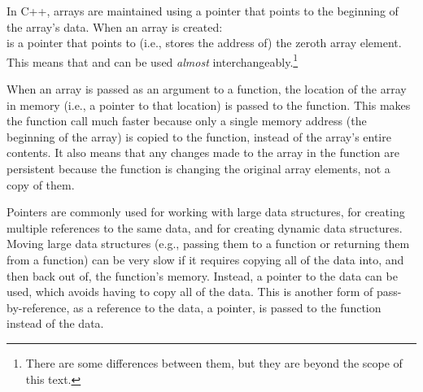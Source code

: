 
In C++, arrays are maintained using a pointer that points to the beginning of the array's data.  When an array is created:\\
 is a pointer that points to (i.e., stores the address of) the zeroth array element.  This means that  and  can be used \emph{almost} interchangeably.\footnote{There are some differences between them, but they are beyond the scope of this text.}  

When an array is passed as an argument to a function, the location of the array in memory (i.e., a pointer to that location) is passed to the function.  This makes the function call much faster because only a single memory address (the beginning of the array) is copied to the function, instead of the array's entire contents.  It also means that any changes made to the array in the function are persistent because the function is changing the original array elements, not a copy of them.




Pointers are commonly used for working with large data structures, for creating multiple references to the same data, and for creating dynamic data structures.  Moving large data structures (e.g., passing them to a function or returning them from a function) can be very slow if it requires copying all of the data into, and then back out of, the function's memory.  Instead, a pointer to the data can be used, which avoids having to copy all of the data.  This is another form of pass-by-reference, as a reference to the data, a pointer, is passed to the function instead of the data.  

